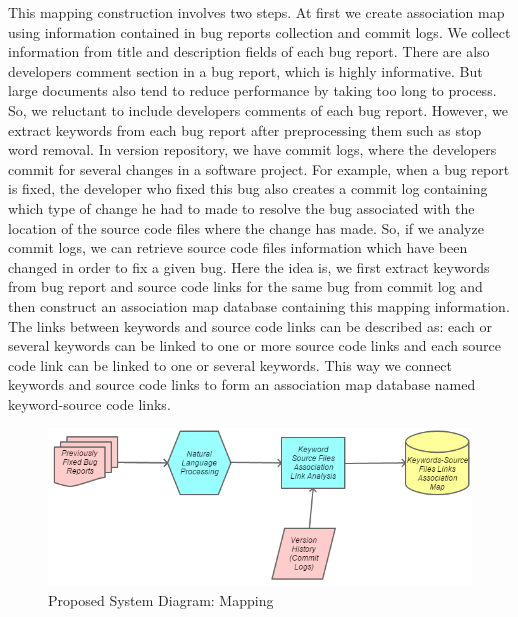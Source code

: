 \documentclass{sig-alternate}
\begin{document}
This mapping construction involves two steps.
At first we create association map using information contained in bug reports collection and commit logs. We collect information from title and description fields of each bug report. There are also developers comment section in a bug report, which is highly informative. But large documents also tend to reduce performance by taking too long to process. So, we reluctant to include developers comments of each bug report. However, we extract keywords from each bug report after preprocessing them such as stop word removal. 
In version repository, we have commit logs, where the developers commit for several changes in a software project. For example, when a bug report is fixed, the developer who fixed this bug also creates a commit log containing which type of change he had to made to resolve the bug associated with the location of the source code files where the change has made. So, if we analyze commit logs, we can retrieve source code files information which have been changed in order to fix a given bug. Here the idea is, we first extract keywords from bug report and source code links for the same bug from commit log and then construct an association map database containing this mapping information. The links between keywords and source code links can be described as: each or several keywords can be linked to one or more source code links and each source code link can be linked to one or several keywords. This way we connect keywords and source code links to form an association map database named keyword-source code links. 

\begin{figure}
\centering
\includegraphics[scale=0.55]{Map}
\caption{Proposed System Diagram: Mapping}
\label{fig:MP}
\end{figure}
\end{document}
